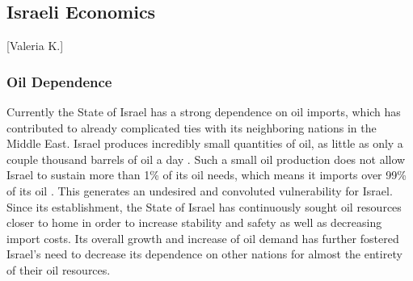 \documentclass{article}                         %
\begin{document}


\subsection{Israeli Economics}[Valeria K.]
\subsubsection{Oil Dependence}
Currently the State of Israel has a strong dependence on oil imports, which has contributed to already complicated ties with its neighboring nations in the Middle East. Israel produces incredibly small quantities of oil, as little as only a couple thousand barrels of oil a day \cite{Engber2006WhereOil}. Such a small oil production does not allow Israel to sustain more than 1\% of its oil needs, which means it imports over 99\% of its oil \cite{Engber2006WhereOil}. This generates an undesired and convoluted vulnerability for Israel. Since its establishment, the State of Israel has continuously sought oil resources closer to home in order to increase stability and safety as well as decreasing import costs. Its overall growth and increase of oil demand has further fostered Israel's need to decrease its dependence on other nations for almost the entirety of their oil resources. 
\end{document}

